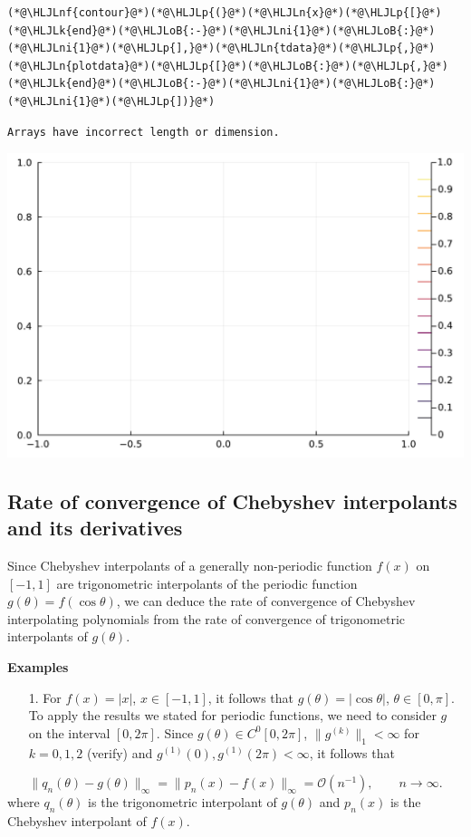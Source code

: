 \documentclass[12pt,a4paper]{article}
\newcommand{\HLJLk}[1]{\textcolor[RGB]{148,91,176}{\textbf{#1}}}
\newcommand{\HLJLn}[1]{#1}
\newcommand{\HLJLnf}[1]{\textcolor[RGB]{66,102,213}{#1}}
\newcommand{\HLJLni}[1]{\textcolor[RGB]{59,151,46}{#1}}
\newcommand{\HLJLoB}[1]{\textcolor[RGB]{102,102,102}{\textbf{#1}}}
\newcommand{\HLJLp}[1]{#1}
\begin{document}
\begin{lstlisting}
(*@\HLJLnf{contour}@*)(*@\HLJLp{(}@*)(*@\HLJLn{x}@*)(*@\HLJLp{[}@*)(*@\HLJLk{end}@*)(*@\HLJLoB{:-}@*)(*@\HLJLni{1}@*)(*@\HLJLoB{:}@*)(*@\HLJLni{1}@*)(*@\HLJLp{],}@*)(*@\HLJLn{tdata}@*)(*@\HLJLp{,}@*)(*@\HLJLn{plotdata}@*)(*@\HLJLp{[}@*)(*@\HLJLoB{:}@*)(*@\HLJLp{,}@*)(*@\HLJLk{end}@*)(*@\HLJLoB{:-}@*)(*@\HLJLni{1}@*)(*@\HLJLoB{:}@*)(*@\HLJLni{1}@*)(*@\HLJLp{])}@*)
\end{lstlisting}

\begin{lstlisting}
Arrays have incorrect length or dimension.
\end{lstlisting}

\includegraphics[width=\linewidth]{jl_ottS6U/Chebyshev_14_1.pdf}

\subsection{Rate of convergence of Chebyshev interpolants and its derivatives}
Since Chebyshev interpolants of a generally non-periodic function $f(x)$ on $[-1, 1]$ are trigonometric interpolants of the periodic function $g(\theta) = f(\cos\theta)$, we can deduce the rate of convergence of Chebyshev interpolating polynomials from the rate of convergence of trigonometric interpolants of $g(\theta)$.

\textbf{Examples}

\begin{itemize}
\item[1. ] For $f(x) = \vert x \vert$, $x \in [-1, 1]$, it follows that $g(\theta) = \vert \cos\theta \vert$, $\theta \in [0, \pi]$.  To apply the results we stated for periodic functions, we need to consider $g$ on the interval $[0, 2\pi]$.  Since $g(\theta) \in C^{0}[0, 2\pi]$, $\| g^{(k)}\|_1 < \infty$ for $k = 0, 1, 2$ (verify) and $g^{(1)}(0), g^{(1)}(2\pi) < \infty$, it follows that

\end{itemize}
\[
\| q_n(\theta) - g(\theta) \|_{\infty} = \| p_n(x) - f(x) \|_{\infty} = \mathcal{O}\left( n^{-1} \right), \qquad n \to \infty.
\]
where $q_n(\theta)$ is the trigonometric interpolant of $g(\theta)$ and $p_n(x)$ is the Chebyshev interpolant of $f(x)$.
\end{document}
